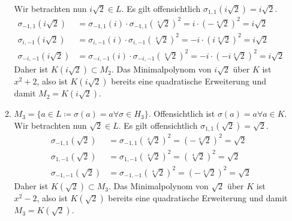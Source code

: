 \documentclass{article}
\begin{document}
\begin{enumerate}[(a)]
\begin{enumerate}[1.]
            Wir betrachten nun $i \sqrt{2}\in L$. Es gilt offensichtlich $\sigma_{1,1}(i\sqrt{2}) = i\sqrt{2}$.
            \begin{align*}
                \sigma_{-1, 1}(i\sqrt{2}) &= \sigma_{-1, 1}(i) \cdot \sigma_{-1, 1}(\sqrt[4]{2})^2 = i \cdot (-\sqrt[4]{2})^2 = i\sqrt{2}\\
                \sigma_{ i,-1}(i\sqrt{2}) &= \sigma_{ i,-1}(i) \cdot \sigma_{ i,-1}(\sqrt[4]{2})^2 =-i \cdot (i\sqrt[4]{2})^2 = i\sqrt{2}\\
                \sigma_{-i,-1}(i\sqrt{2}) &= \sigma_{-i,-1}(i) \cdot \sigma_{-i,-1}(\sqrt[4]{2})^2 =-i \cdot(-i\sqrt[4]{2})^2 = i\sqrt{2}
            \end{align*}
            Daher ist $K(i\sqrt{2}) \subset M_2$. Das Minimalpolynom von $i\sqrt{2}$ über $K$ ist $x^2 + 2$, also ist $K(i\sqrt{2})$ bereits eine quadratische Erweiterung und damit $M_2 = K(i\sqrt{2})$.
            \item $M_3 = \{a \in L\coloneqq \sigma(a) = a \forall \sigma \in H_3\}$. Offensichtlich ist $\sigma(a) = a\forall a \in K$. 
            Wir betrachten nun $\sqrt{2}\in L$. Es gilt offensichtlich $\sigma_{1,1}(\sqrt{2}) = \sqrt{2}$.
            \begin{align*}
                \sigma_{-1, 1}(\sqrt{2}) &= \sigma_{-1, 1}(\sqrt[4]{2})^2 = (-\sqrt[4]{2})^2 = \sqrt{2}\\
                \sigma_{ 1,-1}(\sqrt{2}) &= \sigma_{ 1,-1}(\sqrt[4]{2})^2 = ( \sqrt[4]{2})^2 = \sqrt{2}\\
                \sigma_{-1,-1}(\sqrt{2}) &= \sigma_{-1,-1}(\sqrt[4]{2})^2 = (-\sqrt[4]{2})^2 = \sqrt{2}
            \end{align*}
            Daher ist $K(\sqrt{2}) \subset M_3$. Das Minimalpolynom von $\sqrt{2}$ über $K$ ist $x^2 - 2$, also ist $K(\sqrt{2})$ bereits eine quadratische Erweiterung und damit $M_3 = K(\sqrt{2})$.
        \end{enumerate}
    \end{enumerate}
\end{document}
